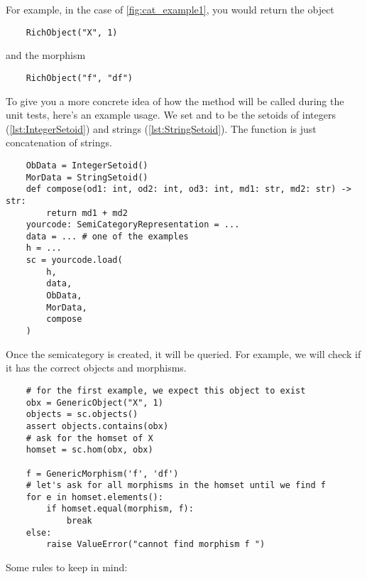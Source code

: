 
For example, in the case of \cref{fig:cat_example1}, you would return the object
\begin{verbatim}
    RichObject("X", 1)
\end{verbatim}
and the morphism
\begin{verbatim}
    RichObject("f", "df")
\end{verbatim}

To give you a more concrete idea of how the method will be called during the unit tests, here's an example usage.
We set   and  to be the setoids of integers (\cref{lst:IntegerSetoid}) and strings (\cref{lst:StringSetoid}).
The  function is just concatenation of strings.

\begin{verbatim}
    ObData = IntegerSetoid()
    MorData = StringSetoid()
    def compose(od1: int, od2: int, od3: int, md1: str, md2: str) -> str:
        return md1 + md2
    yourcode: SemiCategoryRepresentation = ...
    data = ... # one of the examples
    h = ...
    sc = yourcode.load(
        h,
        data,
        ObData,
        MorData,
        compose
    )
\end{verbatim}

Once the semicategory is created, it will be queried.
For example, we will check if it has the correct objects and morphisms.

\begin{verbatim}
    # for the first example, we expect this object to exist
    obx = GenericObject("X", 1)
    objects = sc.objects()
    assert objects.contains(obx)
    # ask for the homset of X
    homset = sc.hom(obx, obx)

    f = GenericMorphism('f', 'df')
    # let's ask for all morphisms in the homset until we find f
    for e in homset.elements():
        if homset.equal(morphism, f):
            break
    else:
        raise ValueError("cannot find morphism f ")
\end{verbatim}




Some rules to keep in mind:

